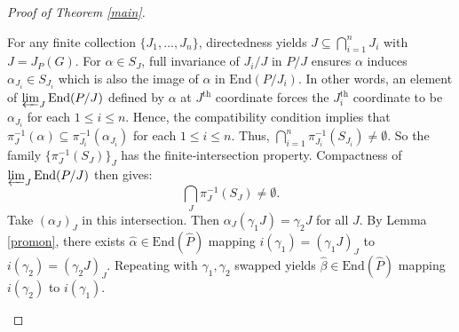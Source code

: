 \documentclass[10pt,a4paper]{amsart}
\begin{document}
\begin{proof}[Proof of Theorem \ref{main}]
\begin{description}
For any finite collection $\{J_1, \dots, J_n\}$, directedness yields $J \subseteq \bigcap_{i=1}^n J_i$ with $J = J_P(G)$. For $\alpha \in S_J$, full invariance of $J_i/J$ in $P/J$ ensures $\alpha$ induces $\alpha_{J_i} \in S_{J_i}$ which is also the image of $\alpha$ in $\mathrm{End}(P/J_i)$. In other words, an element of $\varprojlim_{J} \mathrm{End}(P/J)$ defined by $\alpha$ at $J^{\text{th}}$ coordinate forces the $J_i^{\text{th}}$ coordinate to be $\alpha_{J_i}$ for each $1 \leq i \leq n$. Hence, the compatibility condition implies that $\pi_{J}^{-1}(\alpha) \subseteq \pi_{J_i}^{-1}(\alpha_{J_i})$ for each $1 \leq i \leq n$. Thus, $\bigcap_{i=1}^n \pi_{J_i}^{-1}(S_{J_i}) \neq \emptyset$. So the family $\{\pi_J^{-1}(S_J)\}_J$ has the finite‐intersection property. Compactness of $\varprojlim_{J} \mathrm{End}(P/J)$ then gives:
$$
\bigcap_J \pi_J^{-1}(S_J) \neq \emptyset.
$$
Take $(\alpha_J)_J$ in this intersection. Then $\alpha_J(\gamma_1 J) = \gamma_2 J$ for all $J$. By Lemma \ref{promon}, there exists $\widehat{\alpha} \in \mathrm{End}(\widehat{P})$ mapping $i(\gamma_1) = (\gamma_1 J)_J$ to $i(\gamma_2) = (\gamma_2 J)_J$. Repeating with $\gamma_1,\gamma_2$ swapped yields $\widehat{\beta} \in \mathrm{End}(\widehat{P})$ mapping $i(\gamma_2)$ to $i(\gamma_1)$.
\end{description} 
\end{proof}
\end{document}
